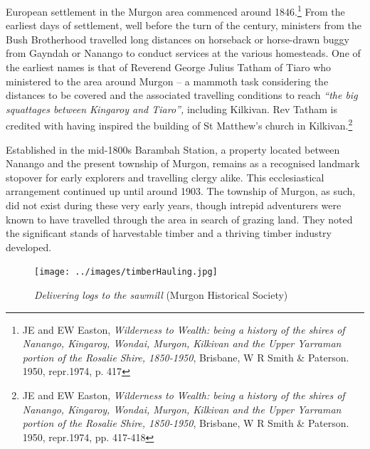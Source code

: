 European settlement in the Murgon area commenced around 1846.\footnote{JE and EW Easton, \emph{Wilderness to Wealth: being a history of the shires of Nanango, Kingaroy, Wondai, Murgon, Kilkivan and the Upper Yarraman portion of the Rosalie Shire, 1850-1950}, Brisbane, W R Smith \& Paterson. 1950, repr.1974, p. 417} From the earliest days of settlement, well before the turn of the century, ministers from the Bush Brotherhood travelled long distances on horseback or horse-drawn buggy from Gayndah or Nanango to conduct services at the various homesteads. One of the earliest names is that of Reverend George Julius Tatham of Tiaro who ministered to the area around Murgon -- a mammoth task considering the distances to be covered and the associated travelling conditions to reach \emph{``the big squattages between Kingaroy and Tiaro'',} including Kilkivan. Rev Tatham is credited with having inspired the building of St Matthew's church in Kilkivan.\footnote{JE and EW Easton, \emph{Wilderness to Wealth: being a history of the shires of Nanango, Kingaroy, Wondai, Murgon, Kilkivan and the Upper Yarraman portion of the Rosalie Shire, 1850-1950}, Brisbane, W R Smith \& Paterson. 1950, repr.1974, pp. 417-418}


Established in the mid-1800s Barambah Station, a property located between Nanango and the present township of Murgon, remains as a recognised landmark stopover for early explorers and travelling clergy alike. This ecclesiastical arrangement continued up until around 1903. The township of Murgon, as such, did not exist during these very early years, though intrepid adventurers were known to have travelled through the area in search of grazing land. They noted the significant stands of harvestable timber and a thriving timber industry developed.









\begin{figure}
\begin{center}
\texttt{[image: ../images/timberHauling.jpg]}
\caption{{\itshape Delivering logs to the sawmill} {\scriptsize(Murgon Historical Society)}}
\end{center}
\end{figure}




